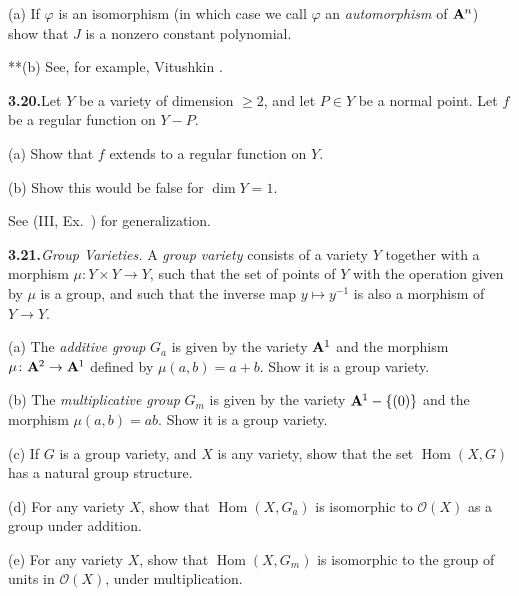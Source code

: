 {(a) If $\varphi$ is an isomorphism (in which case we call $\varphi$ an \emph{automorphism} of $\AffSpace{n}$) show that $J$ is a nonzero constant polynomial.

**(b) \hypertarget{err-I-3.19}{} See, for example, Vitushkin .

\smallskip
\noindent\hypertarget{ex-I-3.20}{}\textbf{3.20.}\enspace Let $Y$ be a variety of dimension $\geqslant2$, and let $P\in Y$ be a normal point. Let $f$ be a regular function on $Y-P$.

(a) Show that $f$ extends to a regular function on $Y$.

(b) Show this would be false for $\dim Y=1$.

See (III, Ex.~) for generalization.

\smallskip
\noindent\hypertarget{ex-I-3.21}{}\textbf{3.21.}\enspace \emph{Group Varieties.} A \emph{group variety} consists of a variety $Y$ together with a morphism $\mu\colon Y\times Y\to Y$, such that the set of points of $Y$ with the operation given by $\mu$ is a group, and such that the inverse map $y\mapsto y^{-1}$ is also a morphism of $Y\to Y$.

(a) The \emph{additive group} $G_a$ is given by the variety $\AffSpace{1}$ and the morphism $\mu\colon\AffSpace{2}\to\AffSpace{1}$ defined by $\mu(a,b)=a+b$. Show it is a group variety.

(b) The \emph{multiplicative group} $G_m$ is given by the variety $\AffSpace{1}-\{(0)\}$ and the morphism $\mu(a,b)=ab$. Show it is a group variety.

(c) If $G$ is a group variety, and $X$ is any variety, show that the set $\operatorname{Hom}(X,G)$ has a natural group structure.

(d) For any variety $X$, show that $\operatorname{Hom}(X,G_a)$ is isomorphic to $\mathcal O(X)$ as a group under addition.

(e) For any variety $X$, show that $\operatorname{Hom}(X,G_m)$ is isomorphic to the group of units in $\mathcal O(X)$, under multiplication.%
}
